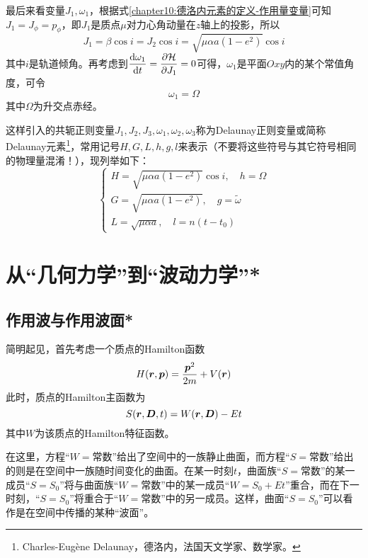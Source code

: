最后来看变量$J_1, \omega_1$，根据式\eqref{chapter10:德洛内元素的定义-作用量变量}可知$J_1=J_\phi=p_\phi$，即$J_1$是质点$\mu$对力心角动量在$z$轴上的投影，所以
\begin{equation}
	J_1 = \beta\cos i = J_2\cos i = \sqrt{\mu\alpha a(1-e^2)}\cos i
\end{equation}
其中$i$是轨道倾角。再考虑到$\dfrac{\mathrm{d} \omega_1}{\mathrm{d} t} = \dfrac{\partial \mathcal{H}}{\partial J_1} = 0$可得，$\omega_1$是平面$Oxy$内的某个常值角度，可令
\begin{equation}
	\omega_1 = \varOmega
\end{equation}
其中$\varOmega$为升交点赤经。

这样引入的共轭正则变量$J_1,J_2,J_3,\omega_1,\omega_2,\omega_3$称为Delaunay正则变量或简称Delaunay元素\footnote{Charles-Eugène Delaunay，德洛内，法国天文学家、数学家。}，常用记号$H,G,L,h,g,l$来表示（不要将这些符号与其它符号相同的物理量混淆！），现列举如下：
\begin{equation}
\begin{cases}
	H = \sqrt{\mu\alpha a(1-e^2)}\cos i,\quad h=\varOmega \\
	G = \sqrt{\mu\alpha a(1-e^2)},\quad g=\tilde{\omega} \\
	L = \sqrt{\mu\alpha a},\quad l = n(t-t_0)
\end{cases}
\end{equation}

\section{从“几何力学”到“波动力学”*}

\subsection{作用波与作用波面*}

简明起见，首先考虑一个质点的Hamilton函数
\begin{equation*}
	H(\boldsymbol{r},\boldsymbol{p}) = \frac{\boldsymbol{p}^2}{2m} + V(\boldsymbol{r})
\end{equation*}
此时，质点的Hamilton主函数为
\begin{equation*}
	S(\boldsymbol{r},\boldsymbol{D},t) = W(\boldsymbol{r},\boldsymbol{D}) - Et
\end{equation*}
其中$W$为该质点的Hamilton特征函数。

在这里，方程“$W=\text{常数}$”给出了空间中的一族静止曲面，而方程“$S=\text{常数}$”给出的则是在空间中一族随时间变化的曲面。在某一时刻$t$，曲面族“$S=\text{常数}$”的某一成员“$S=S_0$”将与曲面族“$W=\text{常数}$”中的某一成员“$W=S_0+Et$”重合，而在下一时刻，“$S=S_0$”将重合于“$W=\text{常数}$”中的另一成员。这样，曲面“$S=S_0$”可以看作是在空间中传播的某种“波面”。

